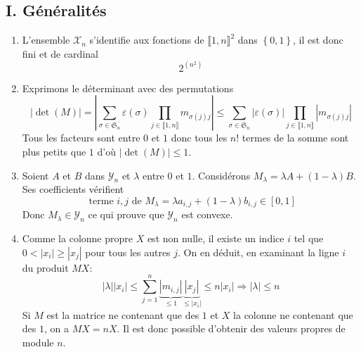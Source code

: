 \subsection*{I. Généralités}
\begin{enumerate}
  \item L'ensemble $\mathcal{X}_n$ s'identifie aux fonctions de $\llbracket 1,n \rrbracket^2$ dans $\left\lbrace 0,1\right\rbrace$, il est donc fini et de cardinal 
\begin{displaymath}
  2^{(n^2)}
\end{displaymath}

  \item Exprimons le déterminant avec des permutations
\begin{displaymath}
\left|\det(M)\right|
=\left|\sum_{\sigma \in \mathfrak{S}_n}\varepsilon(\sigma) \prod_{j\in \llbracket 1,n \rrbracket}m_{\sigma(j)j}\right|
\leq \sum_{\sigma \in \mathfrak{S}_n} |\varepsilon(\sigma)| \prod_{j\in \llbracket 1,n \rrbracket}|m_{\sigma(j)j}|
\end{displaymath}
Tous les facteurs sont entre 0 et $1$ donc tous les $n!$ termes de la somme sont plus petits que $1$ d'où $|\det(M)|\leq 1$.

  \item Soient $A$ et $B$ dans $\mathcal{Y}_n$ et $\lambda$ entre $0$ et $1$. Considérons $M_\lambda = \lambda A + (1-\lambda)B$. Ses coefficients vérifient
\begin{displaymath}
\text{ terme $i,j$ de }M_\lambda = \lambda a_{i,j} + (1-\lambda)b_{i,j}\in \left[  0,1\right]   
\end{displaymath}
Donc $M_\lambda \in \mathcal{Y}_n$ ce qui prouve que $\mathcal{Y}_n$ est convexe.

  \item Comme la colonne propre $X$ est non nulle, il existe un indice $i$ tel que $0<|x_i|\geq |x_j|$ pour tous les autres $j$. On en déduit, en examinant la ligne $i$ du produit $MX$:
\begin{displaymath}
|\lambda||x_i| \leq \sum_{j=1}^n\underset{\leq 1}{\underbrace{|m_{i,j}|}}\underset{\leq |x_i|}{\underbrace{|x_j|}}  
\leq n |x_i|
\Rightarrow |\lambda| \leq n
\end{displaymath}
Si $M$ est la matrice ne contenant que des $1$ et $X$ la colonne ne contenant que des $1$, on a $MX = nX$. Il est donc possible d'obtenir des valeurs propres de module $n$.


\end{enumerate}
